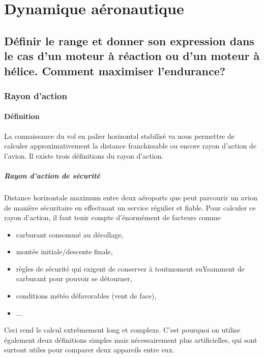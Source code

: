 \documentclass{report}
\begin{document}
\pagestyle{fancy} 
\renewcommand{\footrulewidth}{1pt}

\renewcommand{\thesection}{\arabic{section}}
\renewcommand{\partname}{}
\renewcommand{\labelitemii}{$\bullet$}




\newpage

\chapter{Dynamique aéronautique}

\section{Définir le range et donner son expression dans le cas d'un moteur à réaction ou d'un moteur à hélice. Comment maximiser l'endurance?}

\subsection{Rayon d'action}

\subsubsection{Définition} La connaissance du vol en palier horizontal stabilisé va nous permettre de calculer approximativement la distance franchissable ou encore rayon d’action de l’avion. Il existe trois définitions du rayon d’action.

\paragraph{Rayon d’action de sécurité} Distance horizontale maximum entre deux aéroports
que peut parcourir un avion de manière sécuritaire en effectuant un service
régulier et fiable. Pour calculer ce rayon d’action, il faut tenir compte d'énormément de facteurs comme 
\begin{itemize}
    \item carburant consommé au décollage,
    \item montée initiale/descente finale,
    \item règles de sécurité qui exigent de conserver à toutmoment suYsamment
de carburant pour pouvoir se détourner,
\item conditions météo défavorables (vent de face),
\item ...
\end{itemize}
Ceci rend le calcul extrêmement long et complexe. C’est pourquoi on utilise
également deux définitions simples mais nécessairement plus artificielles,
qui sont surtout utiles pour comparer deux appareils entre eux.
\end{document}
